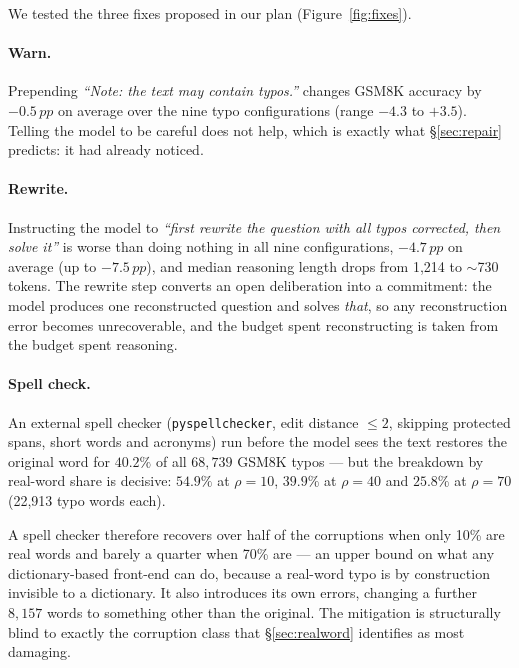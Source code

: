 \documentclass[11pt]{article}
\newcommand{\pp}{\,pp}
\begin{document}
We tested the three fixes proposed in our plan (Figure~\ref{fig:fixes}).

\paragraph{Warn.} Prepending \emph{``Note: the text may contain typos.''}
changes GSM8K accuracy by $-0.5\pp$ on average over the nine typo configurations
(range $-4.3$ to $+3.5$). Telling the model to be careful does not help, which
is exactly what \S\ref{sec:repair} predicts: it had already noticed.

\paragraph{Rewrite.} Instructing the model to \emph{``first rewrite the question
with all typos corrected, then solve it''} is worse than doing nothing in all
nine configurations, $-4.7\pp$ on average (up to $-7.5\pp$), and median
reasoning length drops from 1{,}214 to $\sim$730 tokens. The rewrite step
converts an open deliberation into a commitment: the model produces one
reconstructed question and solves \emph{that}, so any reconstruction error
becomes unrecoverable, and the budget spent reconstructing is taken from the
budget spent reasoning.

\paragraph{Spell check.} An external spell checker (\texttt{pyspellchecker},
edit distance $\leq2$, skipping protected spans, short words and acronyms) run
before the model sees the text restores the original word for $40.2\%$ of all
$68{,}739$ GSM8K typos --- but the breakdown by real-word share is decisive:
$54.9\%$ at $\rho{=}10$, $39.9\%$ at $\rho{=}40$ and $25.8\%$ at $\rho{=}70$
(22{,}913 typo words each).

A spell checker therefore recovers over half of the corruptions when only 10\%
are real words and barely a quarter when 70\% are --- an upper bound on what any
dictionary-based front-end can do, because a real-word typo is by construction
invisible to a dictionary. It also introduces its own errors, changing a further
$8{,}157$ words to something other than the original. The mitigation is
structurally blind to exactly the corruption class that \S\ref{sec:realword}
identifies as most damaging.

\end{document}
